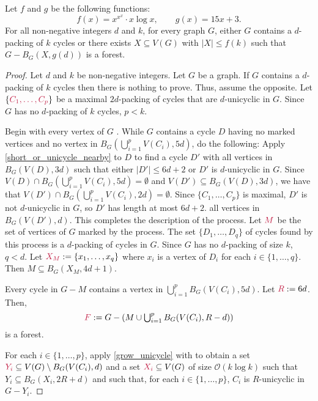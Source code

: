 \documentclass{patmorin}
\newcommand{\Oh}{\mathcal{O}}
\DeclarePairedDelimiter\set{\{}{\}}
\begin{document}
\begin{thm}\label{thm:the-big-ball-of-wax}
Let $f$ and $g$ be the following functions:
\[
f(x)= x^{x^x}\cdot x\log x,\qquad 
g(x)= 15x +3.
\]
For all non-negative integers $d$ and $k$, for every graph $G$, 
either $G$ contains a $d$-packing of $k$ cycles or 
there exists $X\subseteq V(G)$ with $|X|\leq f(k)$ such that
$G-B_G(X,g(d))$ is a forest.
\end{thm}

\begin{proof}
Let $d$ and $k$ be non-negative integers. 
Let $G$ be a graph.
If $G$ contains a $d$-packing of $k$ cycles then there is nothing to prove. 
Thus, assume the opposite. 
Let $\set{\mathdefin{C_1,\ldots,C_p}}$ be a maximal $2d$-packing of cycles that are $d$-unicyclic in $G$.  Since $G$ has no $d$-packing of $k$ cycles, $p<k$.

Begin with every vertex of $G$ .  While $G$ contains a cycle $D$ having no marked vertices and no vertex in $B_G(\bigcup_{i=1}^p V(C_i),5d)$, do the following:  Apply \cref{short_or_unicycle_nearby} to $D$ to find a cycle $D'$ with all vertices in  $B_G(V(D),3d)$ such that either $|D'|\leq 6d+2$ or $D'$ is $d$-unicyclic in $G$. Since $V(D)\cap B_G(\bigcup_{i=1}^p V(C_i),5d)=\emptyset$ and $V(D')\subseteq B_G(V(D),3d)$, we have that $V(D')\cap B_G(\bigcup_{i=1}^p V(C_i),2d)=\emptyset$. Since $\{C_1,\ldots,C_p\}$ is maximal, $D'$ is not $d$-unicyclic in $G$, so $D'$ has length at most $6d+2$.   all vertices in $B_G(V(D'),d)$.  
This completes the description of the process.  Let $\mathdefin{M}$ be the set of vertices of $G$ marked by the process.  The set $\{D_1,\ldots,D_{q}\}$ of cycles found by this process is a $d$-packing of cycles in $G$.  Since $G$ has no $d$-packing of size $k$, $q<d$. Let $\mathdefin{X_M}:=\{x_1,\ldots,x_{q}\}$ where  $x_i$ is a vertex of $D_i$ for each $i\in\{1,\ldots,q\}$. Then $M\subseteq B_G(X_M,4d+1)$.

Every cycle in $G-M$ contains a vertex in $\bigcup_{i=1}^p B_G(V(C_i),5d)$.
Let $\mathdefin{R}:=6d$.
Then, 
\[
\textstyle\mathdefin{F}:=G-\left(M\cup \bigcup_{i=1}^p B_G(V(C_i),R-d)\right)
\]
is a forest.


For each $i\in\{1,\ldots,p\}$, apply \cref{grow_unicycle} with to obtain a set $\mathdefin{Y_i}\subseteq V(G)\setminus B_G(V(C_i),d)$ and a set $\mathdefin{X_i}\subseteq V(G)$ of size $\Oh(k\log k)$ such that $Y_i\subseteq B_G(X_i,2R+d)$ and such that, for each $i\in\{1,\ldots,p\}$, $C_i$ is $R$-unicyclic in $G-Y_i$.


\end{proof}
\end{document}
